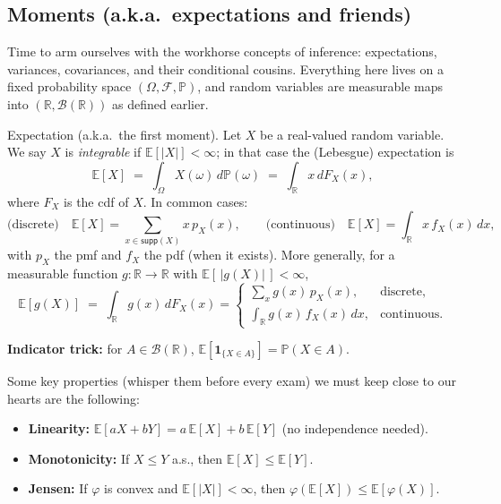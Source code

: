 \subsection{Moments (a.k.a.\ expectations and friends)}

Time to arm ourselves with the workhorse concepts of inference: expectations, variances, covariances, and their conditional cousins. 
Everything here lives on a fixed probability space $(\Omega,\mathcal{F},\mathbb{P})$, and random variables are measurable maps into $(\mathbb{R},\mathcal{B}(\mathbb{R}))$ as defined earlier.

\begin{definition} Expectation (a.k.a.\ the first moment).
Let $X$ be a real-valued random variable. We say $X$ is \emph{integrable} if $\mathbb{E}[|X|]<\infty$; in that case the (Lebesgue) expectation is
\[
\mathbb{E}[X] \;=\; \int_\Omega X(\omega)\, d\mathbb{P}(\omega)
 \;=\; \int_{\mathbb{R}} x\, dF_X(x),
\]
where $F_X$ is the cdf of $X$. In common cases:
\[
\text{(discrete)}\quad \mathbb{E}[X]=\sum_{x\in \mathsf{supp}(X)} x\, p_X(x),
\qquad
\text{(continuous)}\quad \mathbb{E}[X]=\int_{\mathbb{R}} x\, f_X(x)\,dx,
\]
with $p_X$ the pmf and $f_X$ the pdf (when it exists).
More generally, for a measurable function $g:\mathbb{R}\to\mathbb{R}$ with $\mathbb{E}[\,|g(X)|\,]<\infty$,
\[
\mathbb{E}[g(X)] \;=\; \int_{\mathbb{R}} g(x)\, dF_X(x)
= 
\begin{cases}
\sum_x g(x)\,p_X(x), & \text{discrete},\\[4pt]
\int_{\mathbb{R}} g(x)\, f_X(x)\,dx, & \text{continuous}.
\end{cases}
\]

\textbf{Indicator trick:} for $A\in\mathcal{B}(\mathbb{R})$, $\mathbb{E}[\mathbf{1}_{\{X\in A\}}]=\mathbb{P}(X\in A)$.


\end{definition}

 Some key properties (whisper them before every exam) we must keep close to our hearts are the following:
\begin{itemize}
\item \textbf{Linearity:} $\mathbb{E}[aX+bY]=a\,\mathbb{E}[X]+b\,\mathbb{E}[Y]$ (no independence needed).
\item \textbf{Monotonicity:} If $X\le Y$ a.s., then $\mathbb{E}[X]\le \mathbb{E}[Y]$.
\item \textbf{Jensen:} If $\varphi$ is convex and $\mathbb{E}[|X|]<\infty$, then 
$\varphi(\mathbb{E}[X]) \le \mathbb{E}[\varphi(X)]$.
\end{itemize}

